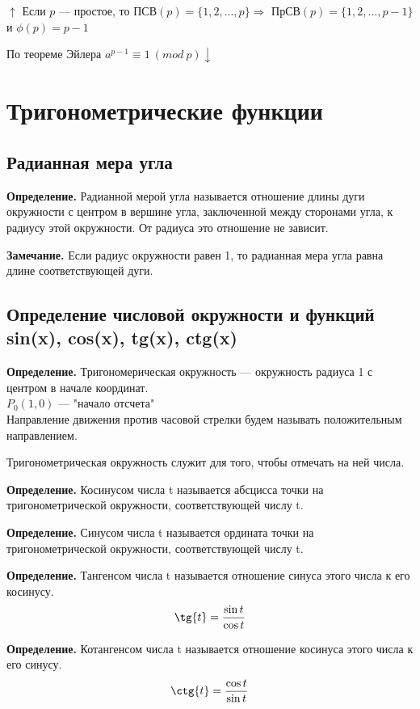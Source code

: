 \documentclass{article}
\begin{document}
            $\uparrow$ Если $p$ --- простое, то ПСВ$(p) = \{1,2,...,p\} \Rightarrow$ ПрСВ$(p) = \{1,2,...,p-1\}$ и $\phi(p)=p - 1$
            
            По теореме Эйлера $a^{p-1} \equiv 1\ (mod\ p) \downarrow$
            
    \section{Тригонометрические функции}
     	\subsection{Радианная мера угла}
        
        \textbf{Определение.} Радианной мерой угла называется отношение длины дуги окружности с центром в вершине угла, заключенной между сторонами угла, к радиусу этой окружности. От радиуса это отношение не зависит.
    
    	\textbf{Замечание.} Если радиус окружности равен 1, то радианная мера угла равна длине соответствующей дуги.
        
        \subsection{Определение числовой окружности и функций sin(x), cos(x), tg(x), ctg(x)}
        
        \textbf{Определение.}  Тригономерическая окружность --- окружность радиуса 1 с центром в начале координат.
        \\ \(P_0(1, 0)\) --- "начало отсчета"
        \\Направление движения против часовой стрелки будем называть положительным направлением.
        
        Тригонометрическая окружность служит для того, чтобы отмечать на ней числа.
        
        \textbf{Определение.} Косинусом числа t называется абсцисса точки на тригонометрической окружности, соответствующей числу t.
        
        \textbf{Определение.} Синусом числа t называется ордината точки на тригонометрической окружности, соответствующей числу t.
        
        \textbf{Определение.} Тангенсом числа t называется отношение синуса этого числа к его косинусу.
        \[\tg{t} = \frac{\sin{t}}{\cos{t}}\]
      
        \textbf{Определение.} Котангенсом числа t называется отношение косинуса этого числа к его синусу.
        \[\ctg{t} = \frac{\cos{t}}{\sin{t}}\]
        
\end{document}
